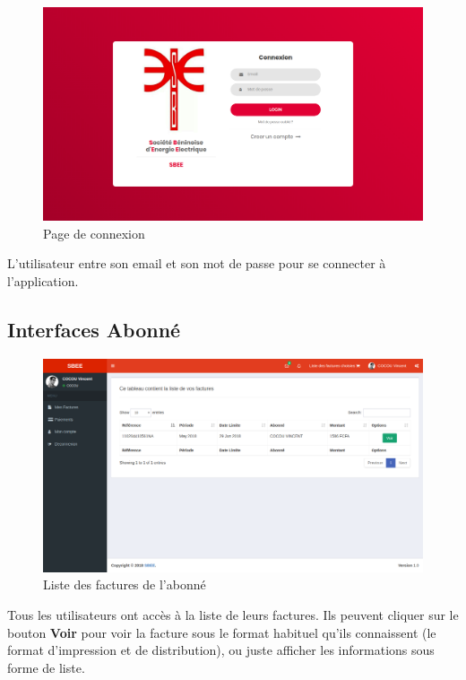 	  \begin{figure}[H]
	      \begin{center}
		  \includegraphics[scale=0.35]{images/login.png}
	      \end{center}
	      \caption{Page de connexion}
	      \label{Page de la whitelist IP}
	  \end{figure}
	  L'utilisateur entre son email et son mot de passe pour se connecter \`a l'application.
      
      \subsection{Interfaces Abonn\'e}
	  \begin{figure}[H]
	      \begin{center}
		  \includegraphics[scale=0.35]{images/listfactures.png}
	      \end{center}
	      \caption{Liste des factures de l'abonn\'e}
	      \label{Page de la whitelist Port}
	  \end{figure}
	  Tous les utilisateurs ont acc\`es \`a la liste de leurs factures. Ils peuvent cliquer sur le bouton \textbf{Voir} pour voir la facture sous le format habituel qu'ils connaissent (le format d'impression et de distribution), ou juste afficher les informations sous forme de liste.
			      
